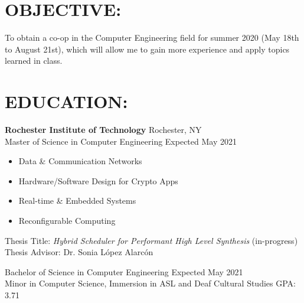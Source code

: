 \documentclass[line,margin]{res}
\begin{document}
\setlength\columnsep{-30pt}
\email{} %
\phone{} %
\address{} %
\address{} %
\website{} %

\begin{resume}
	 \setlength
	 \multicolsep{2pt}

	\section{OBJECTIVE:} %
		To obtain a co-op in the Computer Engineering field for summer 2020 (May 18th to August 21st), which will allow me to gain more experience and apply topics learned in class.

	\section{EDUCATION:} 
		\textbf{Rochester Institute of Technology} \hfill Rochester, NY\\
		Master of Science in Computer Engineering \hfill Expected May 2021 
		\begin{multicols}{2}
			\setlength\columnsep{1pt}
			\begin{itemize}
				\setlength{\itemindent}{-10pt}
				\item[] Data \& Communication Networks
				\item[] Hardware/Software Design for Crypto Apps
				\item[] \hspace{10pt} Real-time \& Embedded Systems
				\item[] \hspace{10pt} Reconfigurable Computing
			\end{itemize}
		\end{multicols}
		\vspace{-11pt}
		Thesis Title: \textit{Hybrid Scheduler for Performant High Level Synthesis} (in-progress) \\
		Thesis Advisor: Dr. Sonia L\'opez Alarc\'on 
		\vspace{-4pt}

		Bachelor of Science in Computer Engineering \hfill Expected May 2021\\ 
		Minor in Computer Science, Immersion in ASL and Deaf Cultural Studies \hfill GPA: 3.71


\end{resume}
\end{document}
